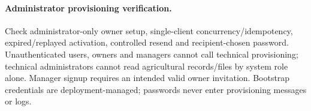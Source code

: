 \paragraph{Administrator provisioning verification.}
Check administrator-only owner setup, single-client concurrency/idempotency,
expired/replayed activation, controlled resend and recipient-chosen password.
Unauthenticated users, owners and managers cannot call technical provisioning;
technical administrators cannot read agricultural records/files by system role alone.
Manager signup requires an intended valid owner invitation. Bootstrap credentials
are deployment-managed; passwords never enter provisioning messages or logs.
